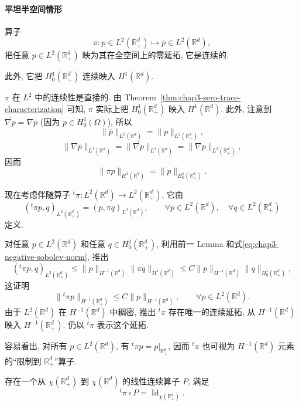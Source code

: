 \paragraph{平坦半空间情形}
\label{subsec:chap4-necas-flat-half-space}

\begin{Lemma}
\label{lem:chap4-zero-extension-and-adjoint-restriction}
算子
\[
 \pi:p\in L^2(\mathbb R_+^d)\longmapsto\overline p\in L^2(\mathbb R^d),
\]
把任意 $p\in L^2(\mathbb R_+^d)$ 映为其在全空间上的零延拓, 它是连续的.

此外, 它把 $H_0^1(\mathbb R_+^d)$ 连续映入 $H^1(\mathbb R^d)$.
\end{Lemma}

\begin{Proof}
$\pi$ 在 $L^2$ 中的连续性是直接的. 由 Theorem~\ref{thm:chap3-zero-trace-characterization} 可知, $\pi$ 实际上把 $H_0^1(\mathbb R_+^d)$ 映入 $H^1(\mathbb R^d)$. 此外, 注意到 $\overline{\nabla p}=\nabla\overline p$ (因为 $p\in H_0^1(\Omega)$), 所以
\[
 \|\overline p\|_{L^2(\mathbb R^d)}=\|p\|_{L^2(\mathbb R_+^d)},
\]
\[
 \|\nabla\overline p\|_{L^2(\mathbb R^d)}
 =\|\overline{\nabla p}\|_{L^2(\mathbb R^d)}
 =\|\nabla p\|_{L^2(\mathbb R_+^d)},
\]
因而
\[
 \|\pi p\|_{H^1(\mathbb R^d)}=\|p\|_{H_0^1(\mathbb R_+^d)}.
\]
\end{Proof}

现在考虑伴随算子 ${}^{t}\!\pi:L^2(\mathbb R^d)\to L^2(\mathbb R_+^d)$, 它由
\[
 ({}^{t}\!\pi p,q)_{L^2(\mathbb R_+^d)}
 =(p,\pi q)_{L^2(\mathbb R^d)},
 \qquad\forall p\in L^2(\mathbb R^d),\quad\forall q\in L^2(\mathbb R_+^d)
\]
定义.

对任意 $p\in L^2(\mathbb R^d)$ 和任意 $q\in H_0^1(\mathbb R_+^d)$, 利用前一 Lemma 和式\eqref{eq:chap3-negative-sobolev-norm}, 推出
\[
 ({}^{t}\!\pi p,q)_{L^2(\mathbb R_+^d)}
 \leq\|p\|_{H^{-1}(\mathbb R^d)}\|\pi q\|_{H^1(\mathbb R^d)}
 \leq C\|p\|_{H^{-1}(\mathbb R^d)}\|q\|_{H_0^1(\mathbb R_+^d)},
\]
这证明
\[
 \|{}^{t}\!\pi p\|_{H^{-1}(\mathbb R_+^d)}
 \leq C\|p\|_{H^{-1}(\mathbb R^d)},
 \qquad\forall p\in L^2(\mathbb R^d).
\]
由于 $L^2(\mathbb R^d)$ 在 $H^{-1}(\mathbb R^d)$ 中稠密, 推出 ${}^{t}\!\pi$ 存在唯一的连续延拓, 从 $H^{-1}(\mathbb R^d)$ 映入 $H^{-1}(\mathbb R_+^d)$. 仍以 ${}^{t}\!\pi$ 表示这个延拓.

容易看出, 对所有 $p\in L^2(\mathbb R^d)$, 有 ${}^{t}\!\pi p=p|_{\mathbb R_+^d}$, 因而 ${}^{t}\!\pi$ 也可视为 $H^{-1}(\mathbb R^d)$ 元素的“限制到 $\mathbb R_+^d$”算子.

\begin{Lemma}
\label{lem:chap4-half-space-chi-extension}
存在一个从 $\chi(\mathbb R_+^d)$ 到 $\chi(\mathbb R^d)$ 的线性连续算子 $P$, 满足
\[
 {}^{t}\!\pi\circ P=\operatorname{Id}_{\chi(\mathbb R_+^d)}.
\]
\end{Lemma}

